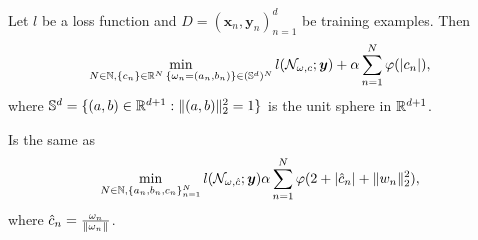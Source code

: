 \documentclass{article}
\begin{document}
    \begin{theorem}
        Let $l$ be a loss function and $D = (\bm{x}_{n}, \bm{y}_{n})_{n=1}^{d}$ be training examples. Then
        \begin{equation}
            \min_{N \in \N, \{c_{n}\} \in \R^{N}\, \{\omega_{n} = (a_{n}, b_{n})\} \in (\mathbb{S}^{d})^{N}} 
            l(\mathcal{N}_{\omega, c} ; \bm{y}) + \alpha \sum_{n=1}^{N} \phi(\abs{c_{n}}),
        \end{equation}
        where $\mathbb{S}^{d} = \{(a,b) \in \R^{d + 1} : \pnorm{2}{(a,b)}^{2} = 1\}$ is the unit sphere in $\R^{d + 1}$.

        Is the same as
        \begin{equation}
            \min_{N \in \N, \{a_{n}, b_{n}, c_{n}\}_{n=1}^{N}} l(\mathcal{N}_{\omega, \hat{c}} ; \bm{y})
            \alpha \sum_{n=1}^{N} \phi(2 + \abs{\hat{c}_{n}} + \pnorm{2}{w_{n}}^{2}),
        \end{equation}
    where $\hat{c}_{n} = \frac{\omega_{n}}{\pnorm{}{\omega_{n}}}$.
    \end{theorem}
    
\end{document}
